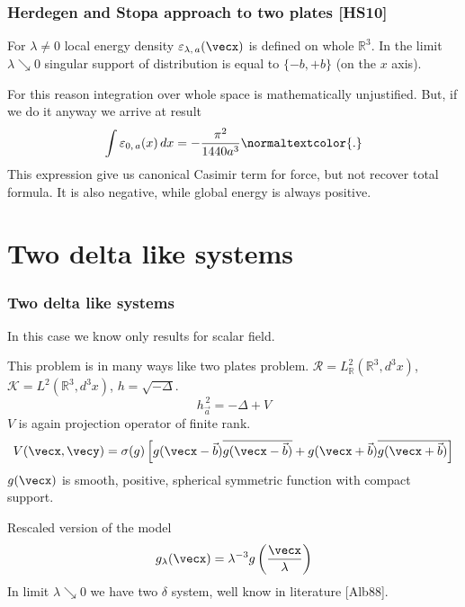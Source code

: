 \documentclass[10pt,t]{beamer}  %
\newcommand{\Rc}{\mathcal{R}}
\begin{document}
\begin{frame}
  \frametitle{Herdegen and Stopa approach to two plates [HS10]}


  For $\lambda \neq 0$ local energy density
  $\varepsilon_{ \lambda,\, a }( \vecx )$ is defined on whole
  $\mathbb{R}^{ 3 }$. In the limit $\lambda \searrow 0$ singular
  support of distribution is equal to $\{ -b, +b \}$ (on the $x$
  axis).

  For this reason integration over whole space is mathematically
  unjustified. But, if we do it anyway we arrive at result
  \begin{equation}
    \label{eq:21}
    \int \varepsilon_{ 0,\, a }( x ) \, dx
    =
    -\frac{ \pi^{ 2 } }{ 1440 a^{ 3 } }\normaltextcolor{.}
  \end{equation}
  This expression give us canonical Casimir term for force, but not
  recover total formula. It is also negative, while global energy is
  always positive.

\end{frame}










\section{Two delta like systems}



\begin{frame}
  \frametitle{Two delta like systems}


  In this case we know only results for scalar field.

  This problem is in many ways like two plates problem.
  $\Rc = L^{ 2 }_{ \mathbb{R} }( \mathbb{R}^{ 3 }, d^{ 3 }x )$,
  $\mathcal{K} = L^{ 2 }( \mathbb{R}^{ 3 }, d^{ 3 }x )$,
  $h = \sqrt{ -\Delta }$.
  \begin{equation}
    h_{ \vec{a} }^{ \, 2 }
    =
    -\Delta + V
  \end{equation}
  $V$ is again projection operator of finite rank.
  \begin{equation}
    \label{eq:22}
    V( \vecx, \vecy )
    =
    \sigma( g ) \left[ g( \vecx - \vec{b} )
      \overline{ g( \vecx - \vec{b} ) } + g( \vecx + \vec{b} )
      \overline{ g( \vecx + \vec{b} ) } \right]
  \end{equation}
  $g( \vecx )$ is smooth, positive, spherical symmetric function with
  compact support.

  Rescaled version of the model
  \begin{equation}
    \label{eq:23}
    g_{ \lambda }( \vecx ) = \lambda^{ -3 } g\left( \frac{ \vecx }{ \lambda }
    \right)
  \end{equation}
  In limit $\lambda \searrow 0$ we have two $\delta$ system, well know
  in literature [Alb88].

\end{frame}
\end{document}
